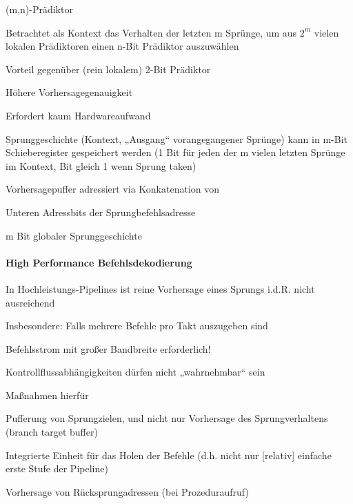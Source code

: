 \documentclass[10pt,landscape]{article}
\begin{document}
\begin{multicols}{3}
  (m,n)-Prädiktor
  \begin{itemize*}
    \item Betrachtet als Kontext das Verhalten der letzten m Sprünge, um aus $2^m$ vielen lokalen Prädiktoren einen n-Bit Prädiktor auszuwählen
    \item Vorteil gegenüber (rein lokalem) 2-Bit Prädiktor
    \item Höhere Vorhersagegenauigkeit
    \item Erfordert kaum Hardwareaufwand
    \item Sprunggeschichte (Kontext, „Ausgang“ vorangegangener Sprünge) kann in m-Bit Schieberegister gespeichert werden (1 Bit für jeden der m vielen letzten Sprünge im Kontext, Bit gleich 1 wenn Sprung taken)
    \item Vorhersagepuffer adressiert via Konkatenation von
    \item Unteren Adressbits der Sprungbefehlsadresse
    \item m Bit globaler Sprunggeschichte
  \end{itemize*}
  
  \paragraph{ High Performance Befehlsdekodierung}
  In Hochleistungs-Pipelines ist reine Vorhersage eines Sprungs i.d.R. nicht ausreichend
  \begin{itemize*}
    \item Insbesondere: Falls mehrere Befehle pro Takt auszugeben sind
    \item Befehlsstrom mit großer Bandbreite erforderlich!
    \item Kontrollflussabhängigkeiten dürfen nicht „wahrnehmbar“ sein 
    \item Maßnahmen hierfür
    \item Pufferung von Sprungzielen, und nicht nur Vorhersage des Sprungverhaltens (branch target buffer)
    \item Integrierte Einheit für das Holen der Befehle (d.h. nicht nur [relativ] einfache erste Stufe der Pipeline)
    \item Vorhersage von Rücksprungadressen (bei Prozeduraufruf)
  \end{itemize*}
  

\end{multicols}
\end{document}
